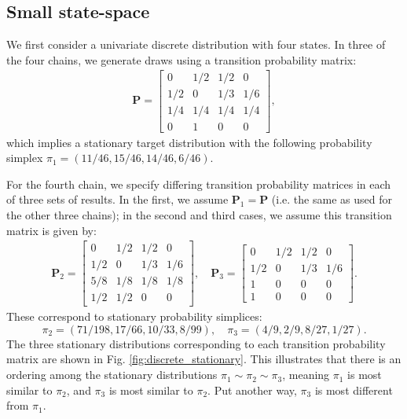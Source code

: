 \documentclass[ba]{imsart}
\numberwithin{equation}{section}
\theoremstyle{plain}
\begin{document}
\begin{supplement}
		\subsection{Small state-space}\label{sec:discrete_small}
		We first consider a univariate discrete distribution with four states. In three of the four chains, we generate draws using a transition probability matrix:
		\begin{gather}
		\boldsymbol{P}
		=
		\begin{bmatrix}
		0 & 1/2 & 1/2 & 0\\
		1/2 & 0 & 1/3 & 1/6\\
		1/4 & 1/4 & 1/4 & 1/4\\
		0 & 1 & 0 & 0
		\end{bmatrix},
		\end{gather}
		which implies a stationary target distribution with the following probability simplex $\pi_1 = (11/46, 15/46, 14/46, 6/46)$.
		
		For the fourth chain, we specify differing transition probability matrices in each of three sets of results. In the first, we assume $\boldsymbol{P}_1=\boldsymbol{P}$ (i.e. the same as used for the other three chains); in the second and third cases, we assume this transition matrix is given by:
		\begin{gather}
		\boldsymbol{P}_2
		=
		\begin{bmatrix}
		0 & 1/2 & 1/2 & 0\\
		1/2 & 0 & 1/3 & 1/6\\
		5/8 & 1/8 & 1/8 & 1/8\\
		1/2 & 1/2 & 0 & 0
		\end{bmatrix},\quad
		\boldsymbol{P}_3
		=
		\begin{bmatrix}
		0 & 1/2 & 1/2 & 0\\
		1/2 & 0 & 1/3 & 1/6\\
		1 & 0 & 0 & 0\\
		1 & 0 & 0 & 0
		\end{bmatrix}.
		\end{gather}
		These correspond to stationary probability simplices:
		\begin{equation}
		\pi_2 = (71/198, 17/66, 10/33, 8/99), \quad \pi_3 = (4/9, 2/9, 8/27, 1/27).
		\end{equation}
		The three stationary distributions corresponding to each transition probability matrix are shown in Fig. \ref{fig:discrete_stationary}. This illustrates that there is an ordering among the stationary distributions $\pi_1\sim\pi_2\sim\pi_3$, meaning $\pi_1$ is most similar to $\pi_2$, and $\pi_3$ is most similar to $\pi_2$. Put another way, $\pi_3$ is most different from $\pi_1$.
		

\end{supplement}
\end{document}
